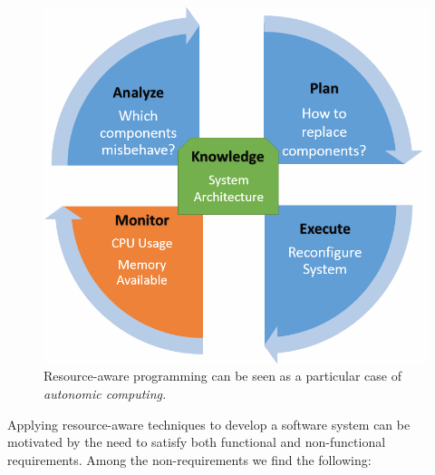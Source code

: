\begin{figure}[!h]
\centering
\includegraphics[scale=0.3]{./chapter1/fig/mape-k.png}
\caption{Resource-aware programming can be seen as a particular case of \textit{autonomic computing.}} \label{fig:resource-aware-vs-autonomic-computing}
\end{figure}

Applying resource-aware techniques to develop a software system can be motivated by the need to satisfy both functional and non-functional requirements.
Among the non-requirements we find the following:

